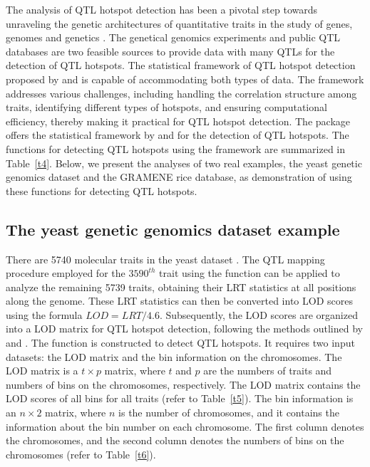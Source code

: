The analysis of QTL hotspot detection has been a pivotal step towards unraveling the genetic architectures of quantitative traits in the study of genes, genomes and genetics \citep{Breitling-2008, Fu-2009, Neto-2012, Wang-2014, Yang-2019, Wu-2021}. The genetical genomics experiments and public QTL databases are two feasible sources to provide data with many QTLs for the detection of QTL hotspots. The statistical framework of QTL hotspot detection proposed by \citet{Yang-2019} and \citet{Wu-2021} is capable of accommodating both types of data. The framework addresses various challenges, including handling the correlation structure among traits, identifying different types of hotspots, and ensuring computational efficiency, thereby making it practical for QTL hotspot detection. The  package offers the statistical framework by \citeauthor{Yang-2019} and \citeauthor{Wu-2021} for the detection of QTL hotspots. The functions for detecting QTL hotspots using the framework are summarized in Table~\ref{t4}. Below, we present the analyses of two real examples, the yeast genetic genomics dataset and the GRAMENE rice database, as demonstration of using these functions for detecting QTL hotspots.

\subsection{The yeast genetic genomics dataset example}

There are 5740 molecular traits in the yeast dataset \citep{Brem-2005}. The QTL mapping procedure employed for the $3590^{th}$ trait using the  function can be applied to analyze the remaining 5739 traits, obtaining their LRT statistics at all positions along the genome. These LRT statistics can then be converted into LOD scores using the formula $LOD = LRT / 4.6$. Subsequently, the LOD scores are organized into a LOD matrix for QTL hotspot detection, following the methods outlined by \citet{Yang-2019} and \citet{Wu-2021}. The  function is constructed to detect QTL hotspots. It requires two input datasets: the LOD matrix and the bin information on the chromosomes. The LOD matrix is a $t\times p$ matrix, where $t$ and $p$ are the numbers of traits and numbers of bins on the chromosomes, respectively. The LOD matrix contains the LOD scores of all bins for all traits (refer to Table~\ref{t5}). The bin information is an $n\times2$ matrix, where $n$ is the number of chromosomes, and it contains the information about the bin number on each chromosome. The first column denotes the chromosomes, and the second column denotes the numbers of bins on the chromosomes (refer to Table~\ref{t6}).

